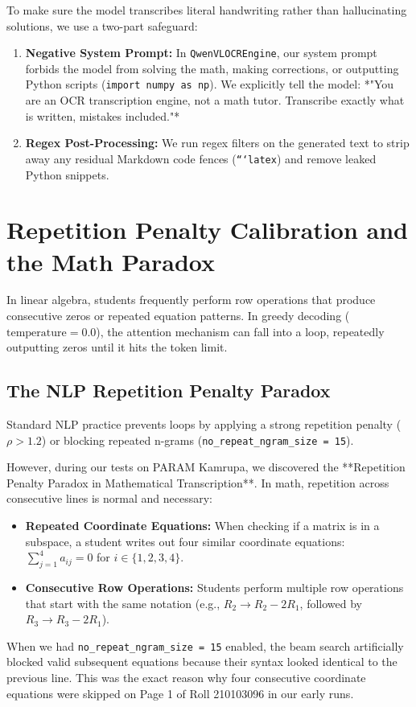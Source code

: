 To make sure the model transcribes literal handwriting rather than hallucinating solutions, we use a two-part safeguard:
\begin{enumerate}
    \item \textbf{Negative System Prompt:} In \texttt{QwenVLOCREngine}, our system prompt forbids the model from solving the math, making corrections, or outputting Python scripts (\texttt{import numpy as np}). We explicitly tell the model: *"You are an OCR transcription engine, not a math tutor. Transcribe exactly what is written, mistakes included."*
    \item \textbf{Regex Post-Processing:} We run regex filters on the generated text to strip away any residual Markdown code fences (\texttt{```latex}) and remove leaked Python snippets.
\end{enumerate}

\section{Repetition Penalty Calibration and the Math Paradox}
\label{sec:repetition_penalty}

In linear algebra, students frequently perform row operations that produce consecutive zeros or repeated equation patterns. In greedy decoding ($\text{temperature} = 0.0$), the attention mechanism can fall into a loop, repeatedly outputting zeros until it hits the token limit.

\subsection{The NLP Repetition Penalty Paradox}
Standard NLP practice prevents loops by applying a strong repetition penalty ($\rho > 1.2$) or blocking repeated n-grams (\texttt{no\_repeat\_ngram\_size = 15}). 

However, during our tests on PARAM Kamrupa, we discovered the **Repetition Penalty Paradox in Mathematical Transcription**. In math, repetition across consecutive lines is normal and necessary:
\begin{itemize}
    \item \textbf{Repeated Coordinate Equations:} When checking if a matrix is in a subspace, a student writes out four similar coordinate equations: $\sum_{j=1}^4 a_{ij} = 0$ for $i \in \{1, 2, 3, 4\}$.
    \item \textbf{Consecutive Row Operations:} Students perform multiple row operations that start with the same notation (e.g., $R_2 \to R_2 - 2R_1$, followed by $R_3 \to R_3 - 2R_1$).
\end{itemize}
When we had \texttt{no\_repeat\_ngram\_size = 15} enabled, the beam search artificially blocked valid subsequent equations because their syntax looked identical to the previous line. This was the exact reason why four consecutive coordinate equations were skipped on Page 1 of Roll 210103096 in our early runs.


